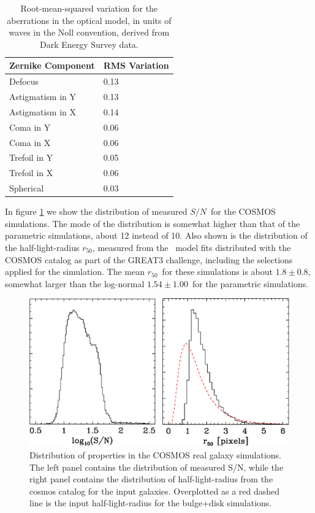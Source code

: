 \documentclass[usegraphicx,usenatbib]{mn2e}
\newcommand{\snr}{$S/N$}
\newcommand{\hlr}{$r_{50}$}
\newcommand{\galrdist}{$1.54 \pm 1.00$}
\newcommand{\cosmosrdist}{$1.8 \pm 0.8$}
\begin{document}
\begin{table}
    \centering
    \caption{Root-mean-squared variation for the aberrations in the optical model,
        in units of waves in the Noll convention, derived 
    from Dark Energy Survey data. \label{tab:aberr}}
    \begin{tabular}{ | l | l | }
        Zernike Component  & RMS Variation \\
        \hline
        Defocus & 0.13 \\
        Astigmatism in Y & 0.13 \\
        Astigmatism in X & 0.14 \\
        Coma in Y & 0.06 \\
        Coma in X & 0.06 \\
        Trefoil in Y & 0.05 \\
        Trefoil in X & 0.06 \\
        Spherical & 0.03 \\

    \end{tabular}
\end{table}

In figure \ref{fig:cosmos} we show the distribution of measured \snr\ for the
COSMOS simulations.  The mode of the distribution is somewhat higher than that
of the parametric simulations, about 12 instead of 10.  Also shown is the
distribution of the half-light-radius \hlr, measured from the \sersic\ model
fits distributed with the COSMOS catalog as part of the GREAT3 challenge,
including the selections applied for the simulation.  The mean \hlr\ for these
simulations is about \cosmosrdist, somewhat larger than the log-normal
\galrdist\ for the parametric simulations.


\begin{figure}
    \centering
    \includegraphics[scale=0.45]{mcal-v14s01-s2n-and-r50.eps}

    \caption{Distribution of properties in the COSMOS real galaxy simulations. The
    left panel contains the distribution of measured S/N, while the right panel contains
    the distribution of half-light-radius from the cosmos catalog for the input
    galaxies.  Overplotted as a red dashed line is the input half-light-radius
    for the bulge+disk simulations.}

\label{fig:cosmos}
\end{figure}
\end{document}
